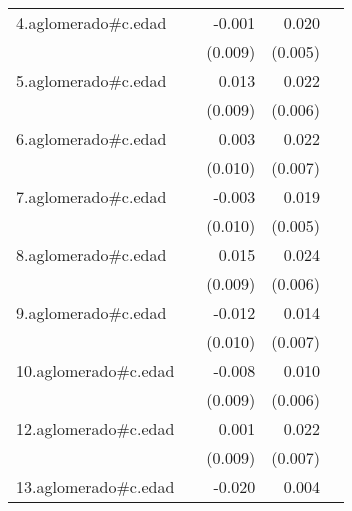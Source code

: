 {\begin{longtable}{l*{4}{D{.}{.}{-1}}}
\addlinespace
4.aglomerado#c.edad&                     &      -0.001         &       0.020\sym{***}&                     \\
            &                     &     (0.009)         &     (0.005)         &                     \\
\addlinespace
5.aglomerado#c.edad&                     &       0.013         &       0.022\sym{***}&                     \\
            &                     &     (0.009)         &     (0.006)         &                     \\
\addlinespace
6.aglomerado#c.edad&                     &       0.003         &       0.022\sym{**} &                     \\
            &                     &     (0.010)         &     (0.007)         &                     \\
\addlinespace
7.aglomerado#c.edad&                     &      -0.003         &       0.019\sym{***}&                     \\
            &                     &     (0.010)         &     (0.005)         &                     \\
\addlinespace
8.aglomerado#c.edad&                     &       0.015         &       0.024\sym{***}&                     \\
            &                     &     (0.009)         &     (0.006)         &                     \\
\addlinespace
9.aglomerado#c.edad&                     &      -0.012         &       0.014\sym{*}  &                     \\
            &                     &     (0.010)         &     (0.007)         &                     \\
\addlinespace
10.aglomerado#c.edad&                     &      -0.008         &       0.010         &                     \\
            &                     &     (0.009)         &     (0.006)         &                     \\
\addlinespace
12.aglomerado#c.edad&                     &       0.001         &       0.022\sym{***}&                     \\
            &                     &     (0.009)         &     (0.007)         &                     \\
\addlinespace
13.aglomerado#c.edad&                     &      -0.020\sym{*}  &       0.004         &                     \\

\end{longtable}}
